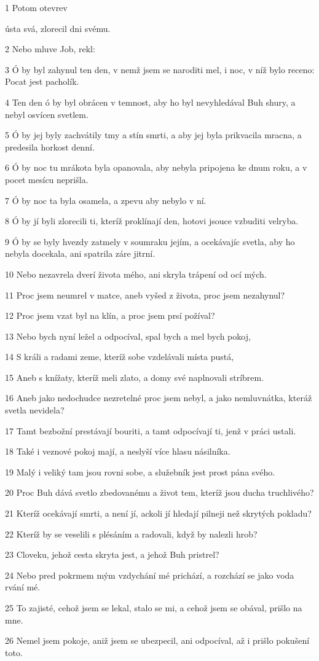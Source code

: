 \par 1 Potom otevrev \par ústa svá, zlorecil dni svému.
\par 2 Nebo mluve Job, rekl:
\par 3 Ó by byl zahynul ten den, v nemž jsem se naroditi mel, i noc, v níž bylo receno: Pocat jest pacholík.
\par 4 Ten den ó by byl obrácen v temnost, aby ho byl nevyhledával Buh shury, a nebyl osvícen svetlem.
\par 5 Ó by jej byly zachvátily tmy a stín smrti, a aby jej byla prikvacila mracna, a predesila horkost denní.
\par 6 Ó by noc tu mrákota byla opanovala, aby nebyla pripojena ke dnum roku, a v pocet mesícu neprišla.
\par 7 Ó by noc ta byla osamela, a zpevu aby nebylo v ní.
\par 8 Ó by jí byli zlorecili ti, kteríž proklínají den, hotovi jsouce vzbuditi velryba.
\par 9 Ó by se byly hvezdy zatmely v soumraku jejím, a ocekávajíc svetla, aby ho nebyla docekala, ani spatrila záre jitrní.
\par 10 Nebo nezavrela dverí života mého, ani skryla trápení od ocí mých.
\par 11 Proc jsem neumrel v matce, aneb vyšed z života, proc jsem nezahynul?
\par 12 Proc jsem vzat byl na klín, a proc jsem prsí požíval?
\par 13 Nebo bych nyní ležel a odpocíval, spal bych a mel bych pokoj,
\par 14 S králi a radami zeme, kteríž sobe vzdelávali místa pustá,
\par 15 Aneb s knížaty, kteríž meli zlato, a domy své naplnovali stríbrem.
\par 16 Aneb jako nedochudce nezretelné proc jsem nebyl, a jako nemluvnátka, kteráž svetla nevidela?
\par 17 Tamt bezbožní prestávají bouriti, a tamt odpocívají ti, jenž v práci ustali.
\par 18 Také i veznové pokoj mají, a neslyší více hlasu násilníka.
\par 19 Malý i veliký tam jsou rovni sobe, a služebník jest prost pána svého.
\par 20 Proc Buh dává svetlo zbedovanému a život tem, kteríž jsou ducha truchlivého?
\par 21 Kteríž ocekávají smrti, a není jí, ackoli jí hledají pilneji než skrytých pokladu?
\par 22 Kteríž by se veselili s plésáním a radovali, když by nalezli hrob?
\par 23 Cloveku, jehož cesta skryta jest, a jehož Buh pristrel?
\par 24 Nebo pred pokrmem mým vzdychání mé prichází, a rozchází se jako voda rvání mé.
\par 25 To zajisté, cehož jsem se lekal, stalo se mi, a cehož jsem se obával, prišlo na mne.
\par 26 Nemel jsem pokoje, aniž jsem se ubezpecil, ani odpocíval, až i prišlo pokušení toto.

